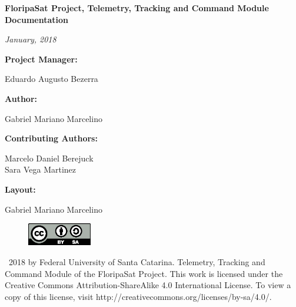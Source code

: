 \documentclass[12pt]{book}
\begin{document}
\thispagestyle{empty}

\begin{center}

\textbf{FloripaSat Project, Telemetry, Tracking and Command Module Documentation}

\textit{January, 2018}

\vspace{1cm}

\textbf{Project Manager:}

Eduardo Augusto Bezerra

\vspace{1cm}

\textbf{Author:}

Gabriel Mariano Marcelino

\vspace{1cm}

\textbf{Contributing Authors:}

Marcelo Daniel Berejuck \\
Sara Vega Martinez \\

\vspace{1cm}

\textbf{Layout:}

Gabriel Mariano Marcelino

\end{center}

\vspace{8cm}

\begin{figure}[!h]
	\begin{center}
		\includegraphics[width=0.25\textwidth]{figures/by-sa.eps}
	\end{center}
\end{figure}

\textcopyright\  2018 by Federal University of Santa Catarina. Telemetry, Tracking and Command Module of the FloripaSat Project. This work is licensed under the Creative Commons Attribution-ShareAlike 4.0 International License. To view a copy of this license, visit http://creativecommons.org/licenses/by-sa/4.0/.

\end{document}
